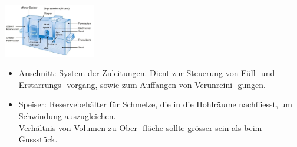 
\begin{minipage}{0.5\linewidth}
    \includegraphics[width = 40mm]{src/images/Giesssystem.png}
\end{minipage}
    \begin{minipage}{0.5\linewidth}
        \begin{itemize}
            \item Anschnitt: System der Zuleitungen.
            Dient zur Steuerung von Füll- und Erstarrungs-
            vorgang, sowie zum Auffangen von Verunreini-
            gungen.
            \item Speiser: Reservebehälter für Schmelze, die in
            die Hohlräume nachfliesst, um Schwindung
            auszugleichen. \\
            Verhältnis von Volumen zu Ober-
            fläche sollte grösser sein als beim Gussstück.
        \end{itemize}
    \end{minipage}
    \vspace{1mm}
